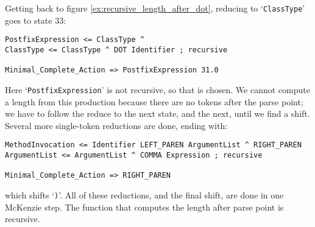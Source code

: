 \documentclass{article}
\newcommand{\code}[1]{`\lstinline|#1|'}
\begin{document}
Getting back to figure \ref{ex:recursive_length_after_dot}, reducing
to \code{ClassType} goes to state 33:
\begin{verbatim}
PostfixExpression <= ClassType ^
ClassType <= ClassType ^ DOT Identifier ; recursive

Minimal_Complete_Action => PostfixExpression 31.0
\end{verbatim}
Here \code{PostfixExpression} is not recursive, so that is chosen. We
cannot compute a length from this production because there are no
tokens after the parse point; we have to follow the reduce to the next
state, and the next, until we find a shift. Several more single-token
reductions are done, ending with:
\begin{verbatim}
MethodInvocation <= Identifier LEFT_PAREN ArgumentList ^ RIGHT_PAREN
ArgumentList <= ArgumentList ^ COMMA Expression ; recursive

Minimal_Complete_Action => RIGHT_PAREN
\end{verbatim}
which shifts \code{)}. All of these reductions, and the final shift,
are done in one McKenzie step. The function that computes the length
after parse point is recursive.
\end{document}
